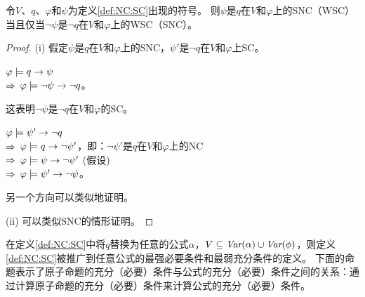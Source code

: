 \begin{proposition}[对偶性]\label{dual}
	令$V$、$q$、$\varphi$和$\psi$为定义\ref{def:NC:SC}出现的符号。
	则$\psi$是$q$在$V$和$\varphi$上的SNC（WSC）当且仅当$\neg \psi$是$\neg q$在$V$和$\varphi$上的WSC（SNC）。
\end{proposition}
\begin{proof}
	(i) 假定$\psi$是$q$在$V$和$\varphi$上的SNC，$\psi'$是$\neg q$在$V$和$\varphi$上SC。
	
	$\varphi \models q \rightarrow \psi$ \\
	$\Rightarrow$ $\varphi \models \neg \psi \rightarrow \neg q$。
	
	这表明$\neg \psi$是$\neg q$在$V$和$\varphi$的SC。
	
	$\varphi \models \psi' \rightarrow \neg q$\\
	$\Rightarrow$ $\varphi \models q \rightarrow \neg \psi'$，即：$\neg \psi'$是$q$在$V$和$\varphi$上的NC\\
	$\Rightarrow$ $\varphi \models \psi \rightarrow \neg \psi'$ \hfill (假设)\\
	$\Rightarrow$ $\varphi \models \psi' \rightarrow \neg \psi$。
	
	另一个方向可以类似地证明。
	
	(ii) 可以类似SNC的情形证明。
\end{proof}


在定义\ref{def:NC:SC}中将$q$替换为任意的公式$\alpha$，$V\subseteq \textit{Var}(\alpha) \cup \textit{Var}(\phi)$，则定义\ref{def:NC:SC}被推广到任意公式的最强必要条件和最弱充分条件的定义。
下面的命题表示了原子命题的充分（必要）条件与公式的充分（必要）条件之间的关系：通过计算原子命题的充分（必要）条件来计算公式的充分（必要）条件。



